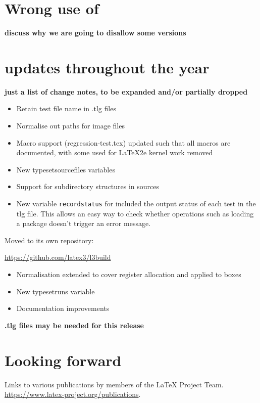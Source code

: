 \documentclass{ltnews}
\begin{document}
\section{Wrong use of }

\textbf{discuss why we are going to disallow some versions}



\section{ updates throughout the year}

\textbf{just a list of change notes, to be expanded and/or partially dropped}

\begin{itemize}
\item Retain test file name in .tlg files
\item Normalise out paths for image files
\item Macro support (regression-test.tex) updated such that
  all macros are documented, with some used for LaTeX2e kernel
  work removed
\item New typesetsourcefiles variables
\item Support for subdirectory structures in sources
\item New variable \texttt{recordstatus} for included the output status of each test in the tlg file. This allows an easy way to check whether operations such as loading a package doesn't trigger an error message.
\end{itemize}

Moved  to its own repository:

\url{https://github.com/latex3/l3build}

\begin{itemize}
\item Normalisation extended to cover
  register allocation and
   applied to boxes
\item New typesetruns variable
\item Documentation improvements
\end{itemize}


\textbf{.tlg files may be needed for this release}

\section{}

\section{}





\section{Looking forward}


\begin{thebibliography}{10}
  \raggedright
    Links to various publications by members of the \LaTeX{} Project Team.
    \newblock \url{https://www.latex-project.org/publications}.
\end{thebibliography}
\end{document}
